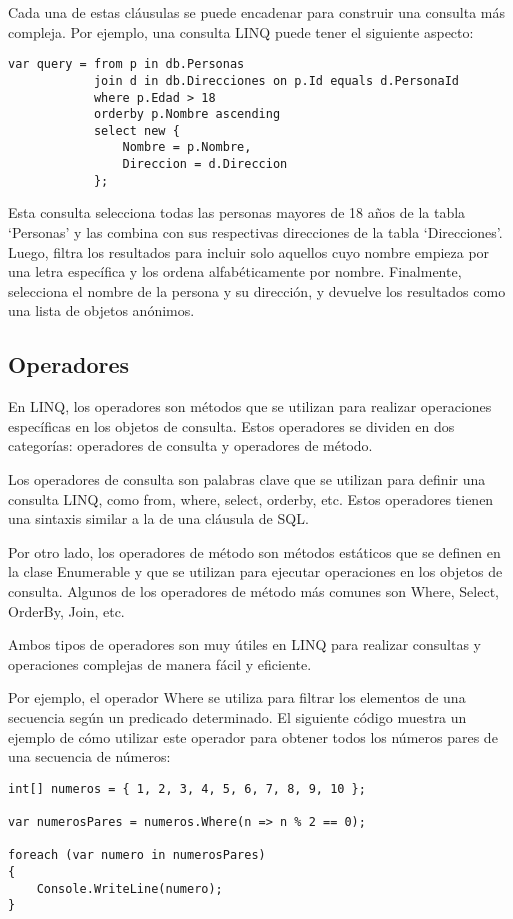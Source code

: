 \documentclass[executivepaper]{article}
\begin{document}
Cada una de estas cláusulas se puede encadenar para construir una consulta más compleja. Por ejemplo, una consulta LINQ puede tener el siguiente aspecto:
\begin{lstlisting}
var query = from p in db.Personas
            join d in db.Direcciones on p.Id equals d.PersonaId
            where p.Edad > 18
            orderby p.Nombre ascending
            select new {
                Nombre = p.Nombre,
                Direccion = d.Direccion
            };    
\end{lstlisting}

Esta consulta selecciona todas las personas mayores de 18 años de la tabla \enquote*{Personas} y las combina con sus respectivas direcciones de la tabla \enquote*{Direcciones}. Luego, filtra los resultados para incluir solo aquellos cuyo nombre empieza por una letra específica y los ordena alfabéticamente por nombre. Finalmente, selecciona el nombre de la persona y su dirección, y devuelve los resultados como una lista de objetos anónimos.

\subsection*{Operadores}

En LINQ, los operadores son métodos que se utilizan para realizar operaciones específicas en los objetos de consulta. Estos operadores se dividen en dos categorías: operadores de consulta y operadores de método.

Los operadores de consulta son palabras clave que se utilizan para definir una consulta LINQ, como from, where, select, orderby, etc. Estos operadores tienen una sintaxis similar a la de una cláusula de SQL.

Por otro lado, los operadores de método son métodos estáticos que se definen en la clase Enumerable y que se utilizan para ejecutar operaciones en los objetos de consulta. Algunos de los operadores de método más comunes son Where, Select, OrderBy, Join, etc.

Ambos tipos de operadores son muy útiles en LINQ para realizar consultas y operaciones complejas de manera fácil y eficiente.

Por ejemplo, el operador Where se utiliza para filtrar los elementos de una secuencia según un predicado determinado. El siguiente código muestra un ejemplo de cómo utilizar este operador para obtener todos los números pares de una secuencia de números:

\begin{lstlisting}
int[] numeros = { 1, 2, 3, 4, 5, 6, 7, 8, 9, 10 };

var numerosPares = numeros.Where(n => n % 2 == 0);

foreach (var numero in numerosPares)
{
    Console.WriteLine(numero);
}
\end{lstlisting}
\end{document}
